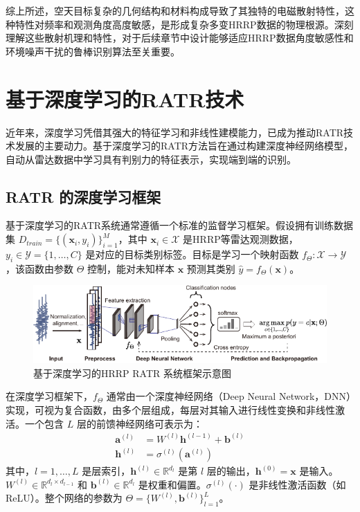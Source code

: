 综上所述，空天目标复杂的几何结构和材料构成导致了其独特的电磁散射特性，这种特性对频率和观测角度高度敏感，是形成复杂多变HRRP数据的物理根源。深刻理解这些散射机理和特性，对于后续章节中设计能够适应HRRP数据角度敏感性和环境噪声干扰的鲁棒识别算法至关重要。

\section{基于深度学习的RATR技术}
\label{sec:深度学习_ratr}

近年来，深度学习凭借其强大的特征学习和非线性建模能力，已成为推动RATR技术发展的主要动力。基于深度学习的RATR方法旨在通过构建深度神经网络模型，自动从雷达数据中学习具有判别力的特征表示，实现端到端的识别。

\subsection{RATR 的深度学习框架}
\label{subsec:深度学习_framework}

基于深度学习的RATR系统通常遵循一个标准的监督学习框架。假设拥有训练数据集 $D_{train} = \{(\mathbf{x}_i, y_i)\}_{i=1}^{M}$，其中 $\mathbf{x}_i \in \mathcal{X}$ 是HRRP等雷达观测数据，$y_i \in \mathcal{Y} = \{1, \dots, C\}$ 是对应的目标类别标签。目标是学习一个映射函数 $f_\Theta: \mathcal{X} \rightarrow \mathcal{Y}$，该函数由参数 $\Theta$ 控制，能对未知样本 $\mathbf{x}$ 预测其类别 $\hat{y} = f_\Theta(\mathbf{x})$。

\begin{figure}[h!]
    \centering
    \includegraphics[width=\linewidth]{figures/ratr_framework.pdf}
    \caption{基于深度学习的HRRP RATR 系统框架示意图}
    \label{fig:深度学习_framework}
\end{figure}

在深度学习框架下，$f_\Theta$ 通常由一个深度神经网络（Deep Neural Network，DNN）实现，可视为复合函数，由多个层组成，每层对其输入进行线性变换和非线性激活。一个包含 $L$ 层的前馈神经网络可表示为：
\begin{align}
    \mathbf{a}^{(l)} &= W^{(l)} \mathbf{h}^{(l-1)} + \mathbf{b}^{(l)} \label{eq:dnn_linear} \\
    \mathbf{h}^{(l)} &= \sigma^{(l)}(\mathbf{a}^{(l)}) \label{eq:dnn_activation}
\end{align}
其中，$l=1, \dots, L$ 是层索引，$\mathbf{h}^{(l)} \in \mathbb{R}^{d_l}$ 是第 $l$ 层的输出，$\mathbf{h}^{(0)} = \mathbf{x}$ 是输入。$W^{(l)} \in \mathbb{R}^{d_l \times d_{l-1}}$ 和 $\mathbf{b}^{(l)} \in \mathbb{R}^{d_l}$ 是权重和偏置。$\sigma^{(l)}(\cdot)$ 是非线性激活函数（如ReLU）。整个网络的参数为 $\Theta = \{W^{(l)}, \mathbf{b}^{(l)}\}_{l=1}^{L}$。


